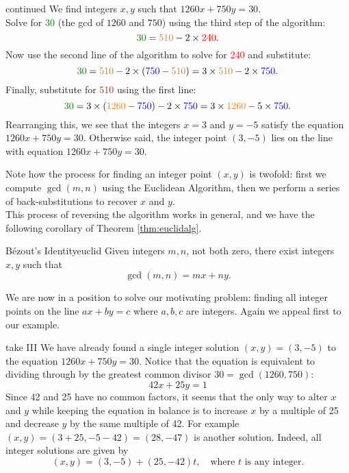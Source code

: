 \begin{example}{continued}{}
We find integers $x,y$ such that $1260x+750y=30$.\\[5pt]
Solve for \textcolor{Green}{30} (the gcd of $1260$ and $750$) using the third step of the algorithm:
\[\textcolor{Green}{30}=\textcolor{brown}{510}-2\times\textcolor{red}{240}.\]
Now use the second line of the algorithm to solve for \textcolor{red}{240} and substitute:
\[\textcolor{Green}{30}=\textcolor{brown}{510}-2\times (\textcolor{blue}{750}-\textcolor{brown}{510})=3\times \textcolor{brown}{510}-2\times \textcolor{blue}{750}.\]
Finally, substitute for \textcolor{brown}{510} using the first line:
\[\textcolor{Green}{30}=3\times (\textcolor{orange}{1260}-\textcolor{blue}{750})-2\times \textcolor{blue}{750}=3\times \textcolor{orange}{1260}-5\times \textcolor{blue}{750}.\]
Rearranging this, we see that the integers $x=3$ and $y=-5$ satisfy the equation $1260x+750y=30$. Otherwise said, the integer point $(3,-5)$ lies on the line with equation $1260x+750y=30$.
\end{example}

 Note how the process for finding an integer point $(x,y)$ is twofold: first we compute $\gcd(m,n)$ using the Euclidean Algorithm, then we perform a series of back-substitutions to recover $x$ and $y$.\\

 This process of reversing the algorithm works in general, and we have the following corollary of Theorem \ref{thm:euclidalg}.

\begin{cor}{Bézout's Identity}{euclid}
Given integers $m,n$, not both zero, there exist integers $x,y$ such that
\[\gcd(m,n)=mx+ny.\]
\end{cor}

We are now in a position to solve our motivating problem: finding all integer points on the line $ax+by=c$ where $a,b,c$ are integers. Again we appeal first to our example.

\begin{example}{take III}{}
We have already found a single integer solution $(x,y)=(3,-5)$ to the equation $1260x+750y=30$. Notice that the equation is equivalent to dividing through by the greatest common divisor $30=\gcd(1260,750)$:
\[42x+25y=1\]
Since 42 and 25 have no common factors, it seems that the only way to alter $x$ and $y$ while keeping the equation in balance is to increase $x$ by a multiple of 25 and decrease $y$ by the same multiple of 42. For example $(x,y)=(3+25,-5-42)=(28,-47)$ is another solution. Indeed, all integer solutions are given by
\[(x,y)=(3,-5)+(25,-42)t,\quad\text{where $t$ is any integer.}\]
\end{example}

